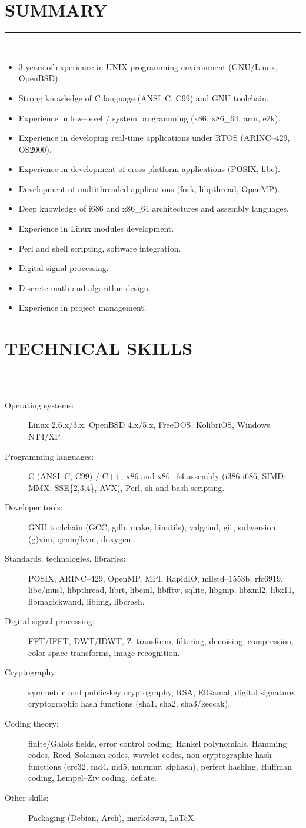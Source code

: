 \documentclass[a4paper,oneside,12pt]{article}
\newcommand{\cvpart}[1]{%
\vspace{-0.9em}%
\section*{\Large\bfseries\MakeTextUppercase{#1}}%
\vspace{-1.7em}%
\rule{\linewidth}{0.3em}\\[-0.8em]%
}
\begin{document}
\cvpart{Summary}
\begin{itemize}
\item 3 years of experience in UNIX programming environment (GNU/Linux, OpenBSD).
\item Strong knowledge of C language (ANSI~C, C99) and GNU toolchain.
\item Experience in low--level / system programming (x86, x86\_64, arm, e2k).
\item Experience in developing real-time applications under RTOS (ARINC--429, OS2000).
\item Experience in development of cross-platform applications (POSIX, libc).
\item Development of multithreaded applications (fork, libpthread, OpenMP).
\item Deep knowledge of i686 and x86\_64 architectures and assembly languages.
\item Experience in Linux modules development.
\item Perl and shell scripting, software integration.
\item Digital signal processing.
\item Discrete math and algorithm design.
\item Experience in project management.
\end{itemize}


\cvpart{Technical skills}
\begin{description}
\item[Operating systems:] Linux 2.6.x/3.x, OpenBSD 4.x/5.x, FreeDOS, KolibriOS, Windows NT4/XP.
\item[Programming languages:] C (ANSI~C, C99) / C++, x86 and x86\_64 assembly (i386-i686, SIMD: MMX, SSE\{2,3,4\}, AVX), Perl, sh and bash scripting.
\item[Developer tools:] GNU toolchain (GCC, gdb, make, binutils), valgrind, git, subversion, (g)vim, qemu/kvm, doxygen.
\item[Standards, technologies, libraries:] POSIX, ARINC--429, OpenMP, MPI, RapidIO, milstd--1553b, rfc6919, libc/musl, libpthread, librt, libeml, libfftw, sqlite, libgmp, libxml2, libx11, libmagickwand, libimg, libcrash.
\item[Digital signal processing:] FFT/IFFT, DWT/IDWT, Z--transform, filtering, denoising, compression, color space transforms, image recognition.
\item[Cryptography:] symmetric and public-key cryptography, RSA, ElGamal, digital signature, cryptographic hash functions (sha1, sha2, sha3/keccak).
\item[Coding theory:] finite/Galois fields, error control coding, Hankel polynomials, Hamming codes, Reed--Solomon codes, wavelet codes, non-cryptographic hash functions (crc32, md4, md5, murmur, siphash), perfect hashing, Huffman coding, Lempel--Ziv coding, deflate.
\item[Other skills:] Packaging (Debian, Arch), markdown, LaTeX.
\end{description}
\end{document}
